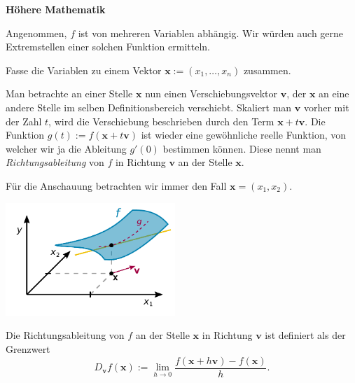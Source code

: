 \documentclass[9pt]{beamer}
\newcommand{\strong}[1]{\textsf{\textbf{#1}}}
\begin{document}
\begin{frame}
\begin{center}
\strong{Höhere Mathematik}
\end{center}
\end{frame}

\begin{frame}
Angenommen, $f$ ist von mehreren Variablen abhängig. Wir würden
auch gerne Extremstellen einer solchen Funktion ermitteln.
\end{frame}

\begin{frame}
Fasse die Variablen zu einem Vektor
$\mathbf x:=(x_1,\ldots,x_n)$
zusammen.\pause

\vspace{0.8em}
Man betrachte an einer Stelle $\mathbf x$ nun einen Verschiebungsvektor
$\mathbf v$, der $\mathbf x$ an eine andere Stelle im selben
Definitionsbereich verschiebt. Skaliert man $\mathbf v$ vorher
mit der Zahl $t$, wird die Verschiebung beschrieben durch den Term
$\mathbf x+t\mathbf v$. Die Funktion
$g(t):=f(\mathbf x+t\mathbf v)$ ist wieder
eine gewöhnliche reelle Funktion, von welcher wir ja die Ableitung
$g'(0)$ bestimmen können. Diese nennt man \emph{Richtungsableitung}
von $f$ in Richtung $\mathbf v$ an der Stelle $\mathbf x$.
\end{frame}

\begin{frame}[t]
\vspace{4em}
Für die Anschauung betrachten wir immer den Fall
$\mathbf x = (x_1,x_2)$.
\pause

\vspace{0.5em}
\begin{center}
\includegraphics[width=64mm]{img/Richtungsableitung.pdf}
\end{center}
\end{frame}

\begin{frame}
\begin{Definition}
Die Richtungsableitung von $f$ an der Stelle $\mathbf x$ in
Richtung $\mathbf v$ ist definiert als der Grenzwert
\[D_{\mathbf v} f(\mathbf x) := \lim_{h\to 0}\frac{f(\mathbf x+h\mathbf v)-f(\mathbf x)}{h}.\]
\end{Definition}
\end{frame}
\end{document}
